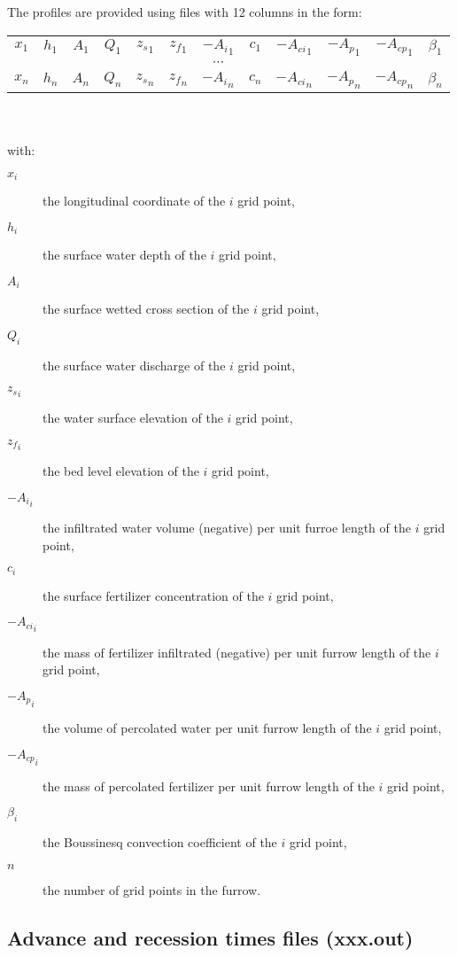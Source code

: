 The profiles are provided using files with 12 columns in the form:\\
\begin{tabular}{cccccccccccc}
$x_1$& $h_1$& $A_1$& $Q_1$& ${z_s}_1$& ${z_f}_1$& $-{A_i}_1$& $c_1$&
	$-{A_{ci}}_1$& $-{A_p}_1$& $-{A_{cp}}_1$& $\beta_1$\\
&&&&&&$\cdots$\\
$x_n$& $h_n$& $A_n$& $Q_n$& ${z_s}_n$& ${z_f}_n$& $-{A_i}_n$& $c_n$&
	$-{A_{ci}}_n$& $-{A_p}_n$& $-{A_{cp}}_n$& $\beta_n$
\end{tabular}\\\\
with:
\begin{description}
\item[$x_i$] the longitudinal coordinate of the $i$ grid point,
\item[$h_i$] the surface water depth of the $i$ grid point,
\item[$A_i$] the surface wetted cross section of the $i$ grid point,
\item[$Q_i$] the surface water discharge of the $i$ grid point,
\item[${z_s}_i$] the water surface elevation of the $i$ grid point,
\item[${z_f}_i$] the bed level elevation of the $i$ grid point,
\item[$-{A_i}_i$] the infiltrated water volume (negative) per unit furroe length of the $i$ grid point,
\item[$c_i$] the surface fertilizer concentration of the $i$ grid point,
\item[$-{A_{ci}}_i$] the mass of fertilizer infiltrated (negative) per unit furrow length of the $i$ grid point,
\item[$-{A_p}_i$] the volume of percolated water per unit furrow length of the $i$ grid point,
\item[$-{A_{cp}}_i$] the mass of percolated fertilizer per unit furrow length of the $i$ grid point,
\item[$\beta_i$] the Boussinesq convection coefficient of the $i$ grid point, 
\item[$n$] the number of grid points in the furrow.
\end{description}

\subsection{Advance and recession times files (xxx.out)}

